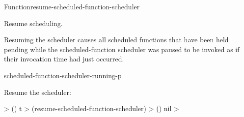\documentclass[10pt,twoside,english,pdftex]{article}
\begin{document}
\begin{functiondoc}{Function}{resume-scheduled-function-scheduler}%
  {\noargs{}}
%

\fnsyntax

\fnpurpose Resume  scheduling.

\fnpackage {}

\fnmodule {}

\fnerrors
\nothreads{}

\fndescription Resuming the  scheduler causes all
scheduled functions that have been held pending while the scheduled-function
scheduler was paused to be invoked as if their invocation time had just
occurred.

\begin{alsos}{scheduled-function-scheduler-running-p}
\end{alsos}

%
\fnexample
Resume the  scheduler:
%
\W\supp
\begin{example}
  > ()
  t
  > (resume-scheduled-function-scheduler)
  > ()
  nil
  >
\end{example}

\end{functiondoc}

\end{document}
